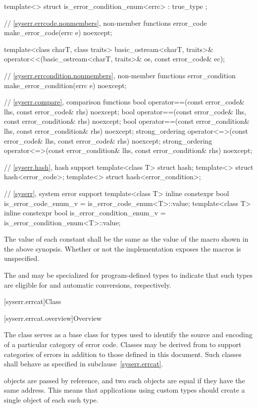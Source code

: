 \begin{codeblock}
{  template<> struct is_error_condition_enum<errc> : true_type {};

  // \ref{syserr.errcode.nonmembers}, non-member functions
  error_code make_error_code(errc e) noexcept;

  template<class charT, class traits>
    basic_ostream<charT, traits>&
      operator<<(basic_ostream<charT, traits>& os, const error_code& ec);

  // \ref{syserr.errcondition.nonmembers}, non-member functions
  error_condition make_error_condition(errc e) noexcept;

  // \ref{syserr.compare}, comparison functions
  bool operator==(const error_code& lhs, const error_code& rhs) noexcept;
  bool operator==(const error_code& lhs, const error_condition& rhs) noexcept;
  bool operator==(const error_condition& lhs, const error_condition& rhs) noexcept;
  strong_ordering operator<=>(const error_code& lhs, const error_code& rhs) noexcept;
  strong_ordering operator<=>(const error_condition& lhs, const error_condition& rhs) noexcept;

  // \ref{syserr.hash}, hash support
  template<class T> struct hash;
  template<> struct hash<error_code>;
  template<> struct hash<error_condition>;

  // \ref{syserr}, system error support
  template<class T>
    inline constexpr bool is_error_code_enum_v = is_error_code_enum<T>::value;
  template<class T>
    inline constexpr bool is_error_condition_enum_v = is_error_condition_enum<T>::value;
}
\end{codeblock}

\pnum
The value of each  constant shall be the same as
the value of the  macro shown in the above synopsis.
Whether or not the  implementation
exposes the  macros is unspecified.

\pnum
The  and  may be
specialized for program-defined types to indicate that such types are eligible
for  and  automatic
conversions, respectively.

[syserr.errcat]{Class }

[syserr.errcat.overview]{Overview}

\pnum
The class  serves as a base class for types used
to identify the source and encoding of a particular category of error code.
Classes may be derived from  to support
categories of errors in addition to those defined in this document.
Such classes shall behave as specified in subclause~\ref{syserr.errcat}.
\begin{note}
 objects are
passed by reference, and two such objects
are equal if they have the same address. This means that applications using
custom  types should create a single object of each
such type.
\end{note}

